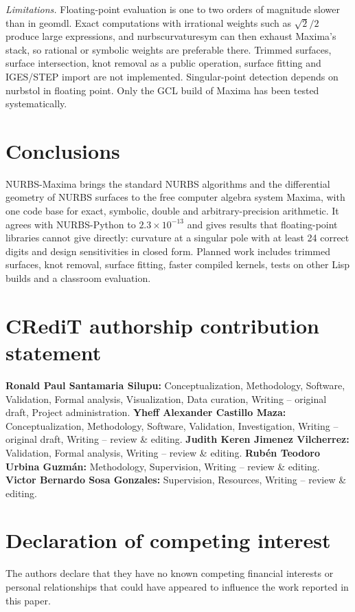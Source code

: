\documentclass[preprint,12pt]{elsarticle}
\newcommand{\pkg}{NURBS-Maxima}
\newcommand{\code}[1]{{\ttfamily\def\_{\textunderscore\allowbreak}#1}}
\begin{document}
\emph{Limitations.} Floating-point evaluation is one to two orders of magnitude slower than in geomdl. Exact computations with irrational weights such as $\sqrt2/2$ produce large expressions, and \code{nurbs\_curvature\_sym} can then exhaust Maxima's stack, so rational or symbolic weights are preferable there. Trimmed surfaces, surface intersection, knot removal as a public operation, surface fitting and IGES/STEP import are not implemented. Singular-point detection depends on \code{nurbs\_tol} in floating point. Only the GCL build of Maxima has been tested systematically.

\section{Conclusions}
\label{sec:conclusions}

\pkg{} brings the standard NURBS algorithms and the differential geometry of NURBS surfaces to the free computer algebra system Maxima, with one code base for exact, symbolic, double and arbitrary-precision arithmetic. It agrees with NURBS-Python to $2.3\times10^{-13}$ and gives results that floating-point libraries cannot give directly: curvature at a singular pole with at least 24 correct digits and design sensitivities in closed form. Planned work includes trimmed surfaces, knot removal, surface fitting, faster compiled kernels, tests on other Lisp builds and a classroom evaluation.

\section*{CRediT authorship contribution statement}
\textbf{Ronald Paul Santamaria Silupu:} Conceptualization, Methodology, Software, Validation, Formal analysis, Visualization, Data curation, Writing -- original draft, Project administration. \textbf{Yheff Alexander Castillo Maza:} Conceptualization, Methodology, Software, Validation, Investigation, Writing -- original draft, Writing -- review \& editing. \textbf{Judith Keren Jimenez Vilcherrez:} Validation, Formal analysis, Writing -- review \& editing. \textbf{Rubén Teodoro Urbina Guzmán:} Methodology, Supervision, Writing -- review \& editing. \textbf{Victor Bernardo Sosa Gonzales:} Supervision, Resources, Writing -- review \& editing.

\section*{Declaration of competing interest}
The authors declare that they have no known competing financial interests or personal relationships that could have appeared to influence the work reported in this paper.
\end{document}
